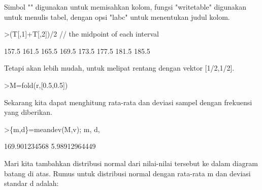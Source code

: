 \documentclass[12pt,Times new roman,letterpaper]{book}
\begin{document}
\begin{eulernootebook}
\begin{eulercomment}
\begin{eulercomment}
\begin{eulernootebook}
\begin{eulercomment}
\begin{eulercomment}
\begin{eulercomment}
\begin{eulercomment}
\begin{eulercomment}
\begin{eulercomment}
\begin{eulercomment}
\begin{eulercomment}
Simbol "\textbar{}" digunakan untuk memisahkan kolom, fungsi "writetable"
digunakan untuk menulis tabel, dengan opsi "labc" untuk menentukan
judul kolom.
\end{eulercomment}
\begin{eulerprompt}
>(T[,1]+T[,2])/2 // the midpoint of each interval
\end{eulerprompt}
\begin{euleroutput}
          157.5 
          161.5 
          165.5 
          169.5 
          173.5 
          177.5 
          181.5 
          185.5 
\end{euleroutput}
\begin{eulercomment}
Tetapi akan lebih mudah, untuk melipat rentang dengan vektor
[1/2,1/2].
\end{eulercomment}
\begin{eulerprompt}
>M=fold(r,[0.5,0.5])
\end{eulerprompt}
\begin{euleroutput}
  [157.5,  161.5,  165.5,  169.5,  173.5,  177.5,  181.5,  185.5]
\end{euleroutput}
\begin{eulercomment}
Sekarang kita dapat menghitung rata-rata dan deviasi sampel dengan
frekuensi yang diberikan.
\end{eulercomment}
\begin{eulerprompt}
>\{m,d\}=meandev(M,v); m, d,
\end{eulerprompt}
\begin{euleroutput}
  169.901234568
  5.98912964449
\end{euleroutput}
\begin{eulercomment}
Mari kita tambahkan distribusi normal dari nilai-nilai tersebut ke
dalam diagram batang di atas. Rumus untuk distribusi normal dengan
rata-rata m dan deviasi standar d adalah:


\end{eulercomment}
\end{eulercomment}
\end{eulercomment}
\end{eulercomment}
\end{eulercomment}
\end{eulercomment}
\end{eulercomment}
\end{eulercomment}
\end{eulernootebook}
\end{eulercomment}
\end{eulercomment}
\end{eulernootebook}
\end{document}
